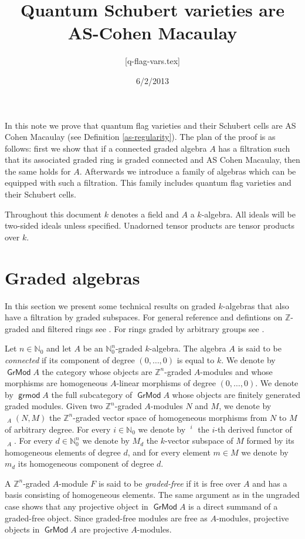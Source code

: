 \documentclass[11pt,fleqn]{article}
\title{Quantum Schubert varieties are AS-Cohen Macaulay}
\author{[q-flag-vars.tex]}
\date{6/2/2013}
\theoremstyle{plain}
\theoremstyle{remark}
\theoremstyle{definition}
\newcommand\NN{\mathbb N}
\newcommand\ZZ{\mathbb Z}
\DeclareMathOperator\Gr{\mathsf{GrMod}}
\DeclareMathOperator\grmod{\mathsf{grmod}}
\DeclareMathOperator\GrHom{\underline{\mathsf{Hom}}}
\DeclareMathOperator\GrExt{\underline{\mathsf{Ext}}}
\begin{document}
\maketitle
In this note we prove that quantum flag varieties and their Schubert cells
are AS Cohen Macaulay (see Definition \ref{as-regularity}). The plan of the proof
is as follows: first we show that if a connected graded algebra $A$ has a
filtration such that its associated graded ring is graded connected and AS Cohen
Macaulay, then the same holds for $A$. Afterwards we introduce a family of algebras 
which can be equipped with such a filtration. This family includes quantum flag varieties
and their Schubert cells.

Throughout this document $k$ denotes a field and $A$ a $k$-algebra. All ideals will be
two-sided ideals unless specified. Unadorned tensor products are tensor products over $k$.

\section{Graded algebras}
In this section we present some technical results on graded $k$-algebras that also have a
filtration by graded subspaces. For general reference and defintions on $\ZZ$-graded and
filtered rings see \cite{VO}. For rings graded by arbitrary groups see \cite{NV}.

Let $n \in \NN_0$ and let $A$ be an $\NN_0^n$-graded $k$-algebra. The algebra $A$ is said 
to be \emph{connected} if its component of degree $(0, \ldots, 0)$ is equal to $k$. We
denote by $\Gr A$ the category whose objects are $\ZZ^n$-graded $A$-modules and whose
morphisms are homogeneous $A$-linear morphisms of degree $(0, \ldots, 0)$. We denote by 
$\grmod A$ the full subcategory of $\Gr A$ whose objects are finitely generated graded
modules. Given two $\ZZ^n$-graded $A$-modules $N$ and $M$, we denote by $\GrHom_A(N,M)$
the $\ZZ^n$-graded vector space of homogeneous morphisms from $N$ to $M$ of arbitrary
degree. For every $i \in \NN_0$ we denote by $\GrExt^i$ the $i$-th derived functor of
$\GrHom_A$. For every $d \in \NN_0^n$ we denote by $M_d$ the $k$-vector subspace of $M$ 
formed by its homogeneous elements of degree $d$, and for every element $m \in M$ we
denote by $m_d$ its homogeneous component of degree $d$. 

A $\ZZ^n$-graded $A$-module $F$ is said to be \emph{graded-free} if it is free over $A$ and 
has a basis
consisting of homogeneous elements. The same argument as in the ungraded case shows that 
any projective object in $\Gr A$ is a direct summand of a graded-free object. Since
graded-free modules are free as $A$-modules, projective objects in $\Gr A$ are projective
$A$-modules.
\end{document}
